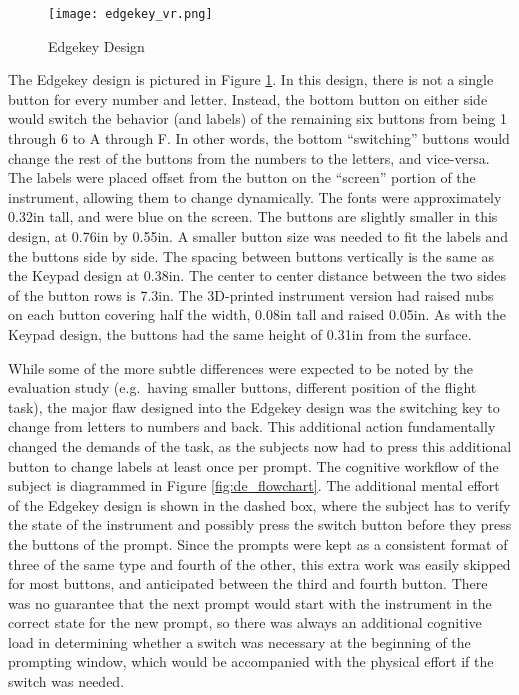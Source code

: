 \begin{figure}
    \centering
    \texttt{[image: edgekey\_vr.png]}
    \caption{Edgekey Design}
    \label{fig:de_edgekey_design}
\end{figure}

The Edgekey design is pictured in Figure \ref{fig:de_edgekey_design}.
In this design, there is not a single button for every number and letter.
Instead, the bottom button on either side would switch the behavior (and labels) of the remaining six buttons from being 1 through 6 to A through F.
In other words, the bottom ``switching'' buttons would change the rest of the buttons from the numbers to the letters, and vice-versa.
The labels were placed offset from the button on the ``screen'' portion of the instrument, allowing them to change dynamically.
The fonts were approximately 0.32in tall, and were blue on the screen.
The buttons are slightly smaller in this design, at 0.76in by 0.55in.
A smaller button size was needed to fit the labels and the buttons side by side.
The spacing between buttons vertically is the same as the Keypad design at 0.38in.
The center to center distance between the two sides of the button rows is 7.3in.
The 3D-printed instrument version had raised nubs on each button covering half the width, 0.08in tall and raised 0.05in.
As with the Keypad design, the buttons had the same height of 0.31in from the surface.

While some of the more subtle differences were expected to be noted by the evaluation study (e.g.\ having smaller buttons, different position of the flight task), the major flaw designed into the Edgekey design was the switching key to change from letters to numbers and back.
This additional action fundamentally changed the demands of the task, as the subjects now had to press this additional button to change labels at least once per prompt.
The cognitive workflow of the subject is diagrammed in Figure \ref{fig:de_flowchart}.
The additional mental effort of the Edgekey design is shown in the dashed box, where the subject has to verify the state of the instrument and possibly press the switch button before they press the buttons of the prompt.
Since the prompts were kept as a consistent format of three of the same type and fourth of the other, this extra work was easily skipped for most buttons, and anticipated between the third and fourth button.
There was no guarantee that the next prompt would start with the instrument in the correct state for the new prompt, so there was always an additional cognitive load in determining whether a switch was necessary at the beginning of the prompting window, which would be accompanied with the physical effort if the switch was needed.

